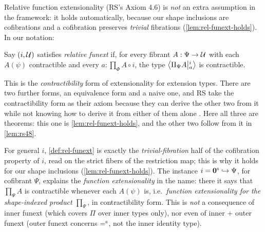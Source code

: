 Relative function extensionality (RS's Axiom 4.6) is \emph{not} an extra
assumption in the framework: it holds automatically,
because our shape inclusions are cofibrations and a cofibration preserves
\emph{trivial} fibrations (\cref{lem:rel-funext-holds}). In our notation:

\begin{definition}\label{def:rel-funext}
	Say $(i,\UU)$ satisfies \emph{relative funext} if, for every fibrant
	$A:\Psi\to\UU$ with each $A(\psi)$ contractible and every
	$a:\prod_\Phi A\circ i$, the type $\Ext{i}{\Pi_\Psi A}{a}$ is contractible.
\end{definition}

\noindent
This is the \emph{contractibility} form of extensionality for extension types.
There are two further forms, an equivalence form and a naive one, and RS take
the contractibility form as their axiom because they can derive the other two
from it while not knowing how to derive it from either of them alone
\citep[\S4.4]{RS2017}. Here all three are theorems: this one is
\cref{lem:rel-funext-holds}, and the other two follow from it in
\cref{lem:rs48}.

\begin{remark}\label{rem:relfunext-is-shape-funext}
	For general $i$, \cref{def:rel-funext} is exactly the
	\emph{trivial-fibration} half of the cofibration property of $i$, read
	on the strict fibers of the restriction map; this is why it holds for
	our shape inclusions (\cref{lem:rel-funext-holds}). The instance
	$i = \szero \hookrightarrow\Psi$, for cofibrant $\Psi$, explains the
	\emph{function extensionality} in the name:
	there it says that $\prod_\Psi A$ is contractible whenever each
	$A(\psi)$ is, i.e.\ \emph{function extensionality for the shape-indexed
	product $\prod_\Psi$}, in contractibility form. This is
	\emph{not} a consequence of inner funext (which covers $\Pi$ over inner
	types only), nor even of inner $+$ outer funext (outer funext concerns
	$\seq$, not the inner identity type).
\end{remark}

